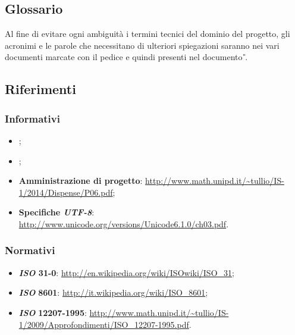 \subsection{Glossario}
Al fine di evitare ogni ambiguità i termini tecnici del dominio del progetto, gli acronimi e le parole che necessitano di ulteriori spiegazioni saranno nei vari documenti marcate con il pedice  e quindi presenti nel documento \textit{\G}.

\subsection{Riferimenti}
\subsubsection{Informativi}
\begin{itemize}
\item
\textit{\PdPv};
\item
\textit{\PdQv};
\item
\textbf{Amministrazione di progetto}: \url{http://www.math.unipd.it/~tullio/IS-1/2014/Dispense/P06.pdf};
\item
\textbf{Specifiche \textit{UTF-8}}: \url{http://www.unicode.org/versions/Unicode6.1.0/ch03.pdf}.
\end{itemize}

\subsubsection{Normativi}
\begin{itemize}
\item
\textbf{\textit{ISO} 31-0}: \url{http://en.wikipedia.org/wiki/ISOwiki/ISO\_31};
\item
\textbf{\textit{ISO}} \textbf{8601}: \url{http://it.wikipedia.org/wiki/ISO\_8601};
\item
\textbf{\textit{ISO}} \textbf{12207-1995}: \url{http://www.math.unipd.it/~tullio/IS-1/2009/Approfondimenti/ISO\_12207-1995.pdf}.

\end{itemize}
